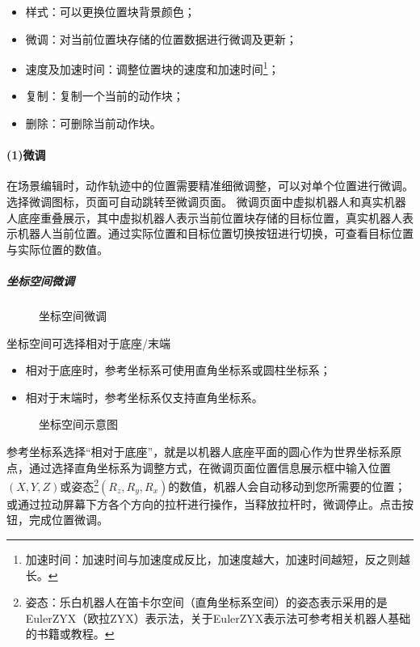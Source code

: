 \begin{itemize}
\item 样式：可以更换位置块背景颜色；
\item 微调：对当前位置块存储的位置数据进行微调及更新；
\item 速度及加速时间：调整位置块的速度和加速时间\footnote{加速时间：加速时间与加速度成反比，加速度越大，加速时间越短，反之则越长。}；
\item 复制：复制一个当前的动作块；
\item 删除：可删除当前动作块。
\end{itemize}

\paragraph{(1)\quad 微调}
\label{sec:微调}
在场景编辑时，动作轨迹中的位置需要精准细微调整，可以对单个位置进行微调。选择微调图标，页面可自动跳转至微调页面。
微调页面中虚拟机器人和真实机器人底座重叠展示，其中虚拟机器人表示当前位置块存储的目标位置，真实机器人表示机器人当前位置。通过实际位置和目标位置切换按钮{\color{red}{缺图}}进行切换，可查看目标位置与实际位置的数值。

\subparagraph{坐标空间微调}

\begin{figure}[ht]
	\centering
	\color{red}{缺图}
	\caption{坐标空间微调}
	\label{fig:坐标空间微调}
\end{figure}

坐标空间可选择相对于底座/末端
\begin{itemize}
	\item 相对于底座时，参考坐标系可使用直角坐标系或圆柱坐标系；
	\item 相对于末端时，参考坐标系仅支持直角坐标系。
\end{itemize}

\begin{figure}[ht]
	\centering
	\color{red}{缺图}
	\caption{坐标空间示意图}
	\label{fig:坐标空间示意图}
\end{figure}

参考坐标系选择“相对于底座”，就是以机器人底座平面的圆心作为世界坐标系原点，通过选择直角坐标系为调整方式，在微调页面位置信息展示框中输入位置$(X, Y, Z)$或姿态\footnote{姿态：乐白机器人在笛卡尔空间（直角坐标系空间）的姿态表示采用的是EulerZYX（欧拉ZYX）表示法，关于EulerZYX表示法可参考相关机器人基础的书籍或教程。}$(R_z, R_y, R_x)$的数值，机器人会自动移动到您所需要的位置；或通过拉动屏幕下方各个方向的拉杆进行操作，当释放拉杆时，微调停止。点击按钮，完成位置微调。

